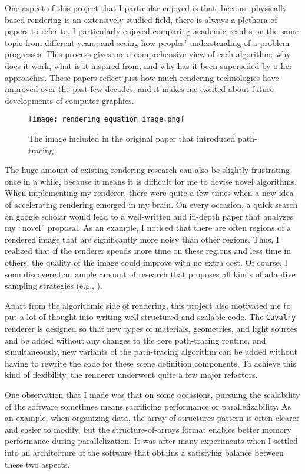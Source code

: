 One aspect of this project that I particular enjoyed is that, because physically based rendering is an extensively studied field, there is always a plethora of papers to refer to. I particularly enjoyed comparing academic results on the same topic from different years, and seeing how peoples' understanding of a problem progresses. This process gives me a comprehensive view of each algorithm: why does it work, what is it inspired from, and why has it been superseded by other approaches. These papers reflect just how much rendering technologies have improved over the past few decades, and it makes me excited about future developments of computer graphics.

\begin{figure}[H]
    \centering
    \texttt{[image: rendering\_equation\_image.png]}
    \caption{The image included in the original paper \cite{rendering_equation} that introduced path-tracing}
\end{figure}

The huge amount of existing rendering research can also be slightly frustrating once in a while, because it means it is difficult for me to devise novel algorithms. When implementing my renderer, there were quite a few times when a new idea of accelerating rendering emerged in my brain. On every occasion, a quick search on google scholar would lead to a well-written and in-depth paper that analyzes my ``novel'' proposal. As an example, I noticed that there are often regions of a rendered image that are significantly more noisy than other regions. Thus, I realized that if the renderer spends more time on these regions and less time in others, the quality of the image could improve with no extra cost. Of course, I soon discovered an ample amount of research that proposes all kinds of adaptive sampling strategies (e.g., \cite{rousselle2011adaptive}). 

Apart from the algorithmic side of rendering, this project also motivated me to put a lot of thought into writing well-structured and scalable code. The \texttt{Cavalry} renderer is designed so that new types of materials, geometries, and light sources and be added without any changes to the core path-tracing routine, and simultaneously, new variants of the path-tracing algorithm can be added without having to rewrite the code for these scene definition components. To achieve this kind of flexibility, the renderer underwent quite a few major refactors.

One observation that I made was that on some occasions, pursuing the scalability of the software sometimes means sacrificing performance or parallelizability. As an example, when organizing data, the array-of-structures pattern is often clearer and easier to modify, but the structure-of-arrays format enables better memory performance during parallelization. It was after many experiments when I settled into an architecture of the software that obtains a satisfying balance between these two aspects.

